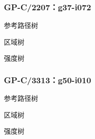 \par\noindent\begin{minipage}{\linewidth}
\subsubsection{GP-C/2207：g37-i072}\leavevmode\par
\noindent\begin{minipage}{\linewidth}
参考路径树\par
\begin{center}\end{center}
\end{minipage}\par\medskip
\noindent\begin{minipage}{\linewidth}
区域树\par
\begin{center}\end{center}
\end{minipage}\par\medskip
\noindent\begin{minipage}{\linewidth}
强度树\par
\begin{center}\end{center}
\end{minipage}\par\medskip
\end{minipage}\par\bigskip
\par\noindent\begin{minipage}{\linewidth}
\subsubsection{GP-C/3313：g50-i010}\leavevmode\par
\noindent\begin{minipage}{\linewidth}
参考路径树\par
\begin{center}\end{center}
\end{minipage}\par\medskip
\noindent\begin{minipage}{\linewidth}
区域树\par
\begin{center}\end{center}
\end{minipage}\par\medskip
\noindent\begin{minipage}{\linewidth}
强度树\par
\begin{center}\end{center}
\end{minipage}\par\medskip
\end{minipage}\par\bigskip
